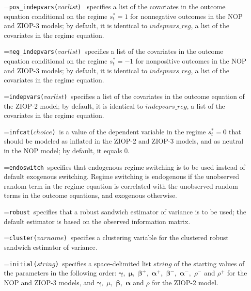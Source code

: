 \documentclass[letterpaper,fleqn,12pt]{article}
\begin{document}
\hangindent=\parindent\noindent \texttt{\texttt{pos}\_indepvars($varlist$) }%
specifies a list of the covariates in the outcome equation conditional on
the regime $s_{t}^{\ast }=1$ for nonnegative outcomes in the NOP and ZIOP-3
models; by default, it is identical to \texttt{$indepvars\_reg$}, a list of
the covariates in the regime equation.

\smallskip

\hangindent=\parindent\noindent \texttt{neg\_indepvars($varlist$) }specifies
a list of the covariates in the outcome equation conditional on the regime $%
s_{t}^{\ast }=-1$ for nonpositive outcomes in the NOP and ZIOP-3 models; by
default, it is identical to \texttt{$indepvars\_reg$}, a list of the
covariates in the regime equation.

\smallskip

\hangindent=\parindent\noindent \texttt{indepvars($varlist$) }specifies a
list of the covariates in the outcome equation of the ZIOP-2 model; by
default, it is identical to \texttt{$indepvars\_reg$}, a list of the
covariates in the regime equation.

\smallskip

\hangindent=\parindent\noindent \texttt{infcat($choice$) }is a value of the
dependent variable in the regime $s_{t}^{\ast }=0$ that should be modeled as
inflated in the ZIOP-2 and ZIOP-3 models, and as neutral in the NOP model;
by default, it equals 0.

\smallskip

\hangindent=\parindent\noindent \texttt{endoswitch }specifies that
endogenous regime switching is to be used instead of default exogenous
switching. Regime switching is endogenous if the unobserved random term in
the regime equation is correlated with the unobserved random terms in the
outcome equations, and exogenous otherwise.

\smallskip

\hangindent=\parindent\noindent \texttt{robust }specifies that a robust
sandwich estimator of variance is to be used; the default estimator is based
on the observed information matrix.

\smallskip

\hangindent=\parindent\noindent \texttt{cluster($varname$) }specifies a
clustering variable for the clustered robust sandwich estimator of variance.

\smallskip

\hangindent=\parindent\noindent \texttt{initial($string$) }specifies a
space-delimited list \texttt{$string$} of the starting values of the
parameters in the following order: $\mathbf{\gamma ,}$ $\mathbf{\mu ,}$ $%
\mathbf{\beta }^{+},$ $\mathbf{\alpha }^{+},$ $\mathbf{\beta }^{-},$ $%
\mathbf{\alpha }^{-},$ $\rho ^{-}$ and $\rho ^{+}$ for the NOP and ZIOP-3
models, and $\mathbf{\gamma },$ $\mu ,$ $\mathbf{\beta },$ $\mathbf{\alpha }$
and $\rho $ for the ZIOP-2 model.
\end{document}
